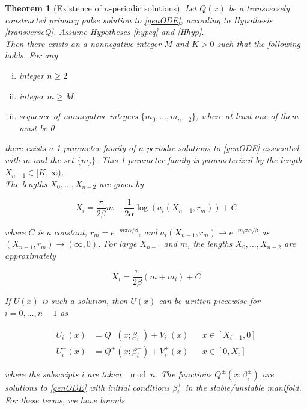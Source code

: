 \documentclass[12pt]{article}
\newtheorem{theorem}{Theorem}
\begin{document}
\begin{theorem}[Existence of $n$-periodic solutions]\label{perexist}
Let $Q(x)$ be a transversely constructed primary pulse solution to \eqref{genODE}, according to Hypothesis \ref{transverseQ}. Assume Hypotheses \ref{hypeq} and \ref{Hhyp}.\\

Then there exists an a nonnegative integer $M$ and $K > 0$ such that the following holds. For any 
\begin{enumerate}[(i)]
\item integer $n \geq 2$ \\
\item integer $m \geq M$ \\
\item sequence of nonnegative integers $\{ m_0, \dots, m_{n-2} \}$, where at least one of them must be 0
\end{enumerate}

there exists a 1-parameter family of $n$-periodic solutions to \eqref{genODE} associated with $m$ and the set $\{ m_j \}$. This 1-parameter family is parameterized by the length $X_{n-1} \in [K, \infty)$.\\

The lengths $X_0, \dots, X_{n-2}$ are given by

\begin{equation}\label{Xi}
X_i = \frac{\pi}{2 \beta}m 
- \frac{1}{2 \alpha} \log(a_i(X_{n-1}, r_m)) + C
\end{equation}

where $C$ is a constant, $r_m = e^{-m \pi \alpha/\beta}$, and $a_i(X_{n-1}, r_m) \rightarrow e^{-m_i \pi \alpha/ \beta}$ as $(X_{n-1}, r_m) \rightarrow (\infty, 0)$. For large $X_{n-1}$ and $m$, the lengths $X_0, \dots, X_{n-2}$ are approximately

\begin{equation}\label{Xiapprox}
X_i = \frac{\pi}{2 \beta}(m + m_i) + C
\end{equation}

If $U(x)$ is such a solution, then $U(x)$ can be written piecewise for $i = 0, \dots, n-1$ as 

\begin{align}
U_i^-(x) &= Q^-(x; \beta_i^-) + V_i^-(x) && x \in [X_{i-1}, 0] \\
U_i^+(x) &= Q^+(x; \beta_i^+) + V_i^+(x) && x \in [0, X_i]
\end{align}

where the subscripts $i$ are taken $\mod n$. The functions $Q^\pm(x; \beta_i^\pm)$ are solutions to \eqref{genODE} with initial conditions $\beta_i^\pm$ in the stable/unstable manifold. For these terms, we have bounds


\end{theorem}
\end{document}
